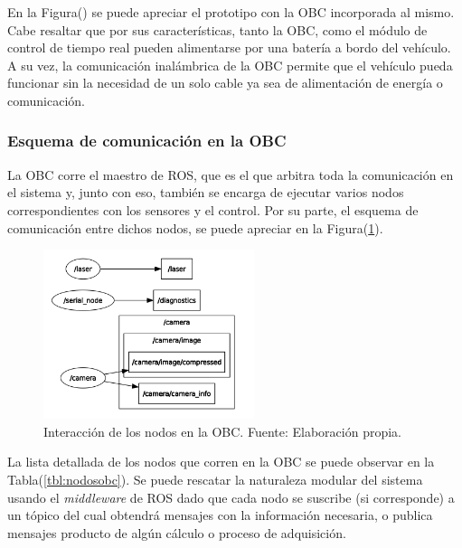     En la Figura() se puede apreciar el prototipo con la OBC incorporada al mismo. Cabe resaltar que por sus características, tanto 
    la OBC, como el módulo de control de tiempo real pueden alimentarse por una batería a bordo del vehículo. A su vez, la comunicación 
    inalámbrica de la OBC permite que el vehículo pueda funcionar sin la necesidad de un solo cable ya sea de alimentación de energía 
    o comunicación.

    \subsubsection{Esquema de comunicación en la OBC}
    La OBC corre el maestro de ROS, que es el que arbitra toda la comunicación en el sistema y, junto con eso, también se encarga 
    de ejecutar varios nodos correspondientes con los sensores y el control. Por su parte, el esquema de comunicación entre dichos nodos, se puede apreciar en 
    la Figura(\ref{fig:nodosobc}).

    
    \begin{figure}[!h] 
        \centering
        \includegraphics[width=0.55\textwidth]{img/nodosobc}
        \caption[Interacción de los nodos en la OBC]{Interacción de los nodos en la OBC. Fuente: Elaboración propia. }
        \label{fig:nodosobc}
    \end{figure}
    
    La lista detallada de los nodos que corren en la OBC se puede observar en la Tabla(\ref{tbl:nodosobc}). Se puede rescatar la naturaleza modular 
    del sistema usando el \textit{middleware} de ROS dado que cada nodo se suscribe (si corresponde) a un tópico del cual obtendrá
    mensajes con la información necesaria, o publica mensajes producto de algún cálculo o proceso de adquisición.

